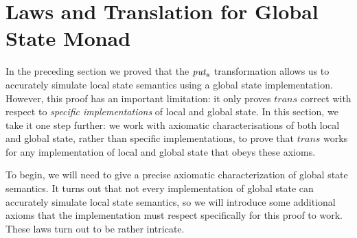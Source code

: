 \documentclass{llncs}
\newcommand{\Varid}[1]{\mathit{#1}}
\let\Varid\mathit
\begin{document}
\section{Laws and Translation for Global State Monad}
\label{sec:ctxt-trans}
In the preceding section we proved that the \ensuremath{\Varid{put}_{\scaleobj{0.7}{\sf R}}} transformation allows us to
accurately simulate local state semantics using a global state implementation.
However, this proof has an important limitation: it only proves \ensuremath{\Varid{trans}} correct
with respect to {\em specific implementations} of local and global state.
In this section, we take it one step further: we work with axiomatic
characterisations of both local and global state, rather than specific
implementations, to prove that \ensuremath{\Varid{trans}} works for any implementation of local
and global state that obeys these axioms.

To begin, we will need to give a precise axiomatic characterization of global
state semantics. It turns out that not every implementation of global state
can accurately simulate local state semantics, so we will introduce some
additional axioms that the implementation must respect specifically for this
proof to work. These laws turn out to be rather intricate.
\end{document}

